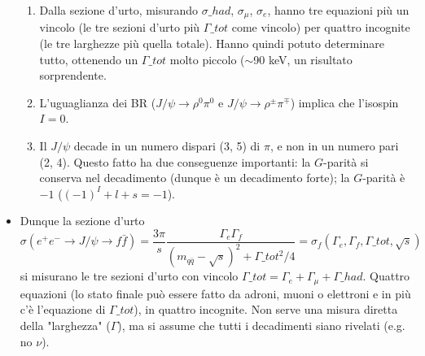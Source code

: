 \begin{itemize}
\begin{enumerate}
        \item Dalla sezione d'urto, misurando $\sigma\_{had}$, $\sigma_\mu$, $\sigma_e$, hanno tre equazioni più un vincolo (le tre sezioni d'urto più $\Gamma\_{tot}$ come vincolo) per quattro incognite (le tre larghezze più quella totale). Hanno quindi potuto determinare tutto, ottenendo un $\Gamma\_{tot}$ molto piccolo ($\sim$90 keV, un risultato sorprendente.
        \item L'uguaglianza dei BR ($J/\psi\to \rho^0\pi^0$ e $J/\psi \to \rho^\pm\pi^\mp$) implica che l'isospin $I=0$.
        \item Il $J/\psi$ decade in un numero dispari (3, 5) di $\pi$, e non in un numero pari (2, 4). Questo fatto ha due conseguenze importanti: la $G$-parità si conserva nel decadimento (dunque è un decadimento forte); la $G$-parità è $-1$ ($(-1)^I+l+s=-1$).
    \end{enumerate}
    \item Dunque la sezione d'urto
    \begin{equation*}
        \sigma(e^+e^-\to J/\psi\to f\bar f)=\frac{3\pi}s\frac{\Gamma_e\Gamma_f}{(m_{q\bar q}-\sqrt s)^2+\Gamma\_{tot}^2/4}=\sigma_f(\Gamma_e,\Gamma_f,\Gamma\_{tot},\sqrt s)
    \end{equation*} 
    si misurano le tre sezioni d'urto con vincolo $\Gamma\_{tot}=\Gamma_e+\Gamma_\mu+\Gamma\_{had}$. Quattro equazioni (lo stato finale può essere fatto da adroni, muoni o elettroni e in più c'è l'equazione di $\Gamma\_{tot}$), in quattro incognite. Non serve una misura diretta della "larghezza" ($\Gamma$), ma si assume che tutti i decadimenti siano rivelati (e.g. no $\nu$).
\end{itemize}
